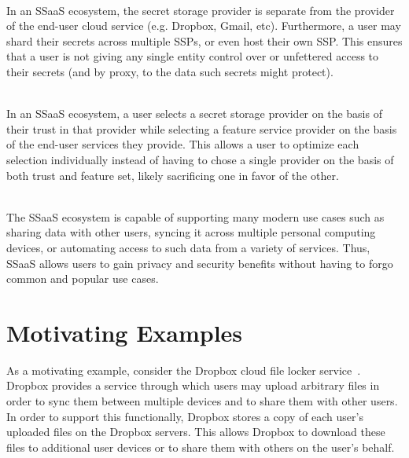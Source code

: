 \begin{packed_desc}
\item[No Single Trusted Third Party] \hfill \\ In an SSaaS ecosystem,
  the secret storage provider is separate from the provider of the
  end-user cloud service (e.g. Dropbox, Gmail, etc). Furthermore, a
  user may shard their secrets across multiple SSPs, or even host
  their own SSP. This ensures that a user is not giving any single
  entity control over or unfettered access to their secrets (and by
  proxy, to the data such secrets might protect).
\item[Separation of Duties] \hfill \\ In an SSaaS ecosystem, a user
  selects a secret storage provider on the basis of their trust in
  that provider while selecting a feature service provider on the
  basis of the end-user services they provide. This allows a user to
  optimize each selection individually instead of having to chose a
  single provider on the basis of both trust and feature set, likely
  sacrificing one in favor of the other.
\item[Support for Existing Use Cases] \hfill \\ The SSaaS ecosystem is
  capable of supporting many modern use cases such as sharing data
  with other users, syncing it across multiple personal computing
  devices, or automating access to such data from a variety of
  services. Thus, SSaaS allows users to gain privacy and security
  benefits without having to forgo common and popular use cases.
\end{packed_desc}

\section{Motivating Examples}
\label{chap:intro:example}

As a motivating example, consider the Dropbox cloud file locker
service~\cite{dropbox}. Dropbox provides a service through which users
may upload arbitrary files in order to sync them between multiple
devices and to share them with other users. In order to support this
functionally, Dropbox stores a copy of each user's uploaded files on
the Dropbox servers. This allows Dropbox to download these files to
additional user devices or to share them with others on the user's
behalf.

